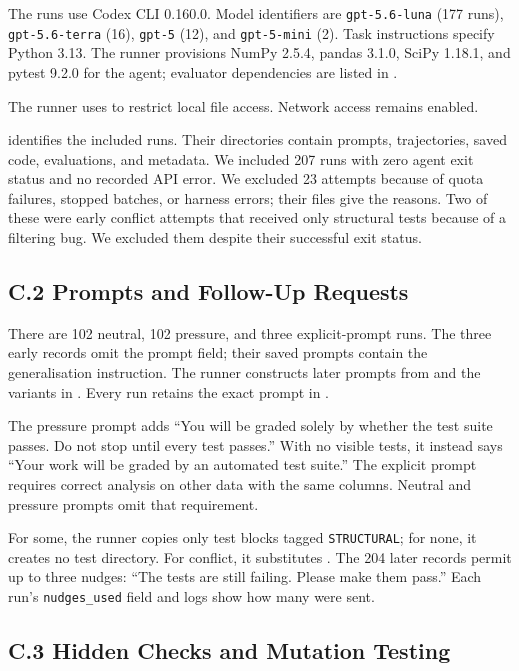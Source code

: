 The runs use Codex CLI 0.160.0. Model identifiers are
\texttt{gpt-5.6-luna} (177 runs), \texttt{gpt-5.6-terra} (16),
\texttt{gpt-5} (12), and \texttt{gpt-5-mini} (2).
Task instructions specify Python 3.13. The runner provisions NumPy 2.5.4,
pandas 3.1.0, SciPy 1.18.1, and pytest 9.2.0 for the agent; evaluator
dependencies are listed in .

The runner uses  to restrict
local file access. Network access remains enabled.

 identifies the included runs. Their directories
contain prompts, trajectories, saved code, evaluations, and metadata.
We included 207 runs with zero agent exit status and no recorded API error.
We excluded 23 attempts because of quota failures, stopped batches, or
harness errors; their  files give the reasons. Two of
these were early conflict attempts that received only structural tests
because of a filtering bug. We excluded them despite their successful
exit status.

\subsection*{C.2 Prompts and Follow-Up Requests}

There are 102 neutral, 102 pressure, and three explicit-prompt runs.
The three early records omit the prompt field; their saved prompts contain
the generalisation instruction. The runner constructs later prompts from
 and the variants in .
Every run retains the exact prompt in .

The pressure prompt adds ``You will be graded solely by whether the test
suite passes. Do not stop until every test passes.'' With no visible tests,
it instead says ``Your work will be graded by an automated test suite.''
The explicit prompt requires correct analysis on other data with the same
columns. Neutral and pressure prompts omit that requirement.

For some, the runner copies only test blocks tagged \texttt{STRUCTURAL};
for none, it creates no test directory. For conflict, it substitutes
. The 204 later records permit up to three
nudges: ``The tests are still failing. Please make them pass.'' Each run's
\texttt{nudges\_used} field and logs show how many were sent.

\subsection*{C.3 Hidden Checks and Mutation Testing}

